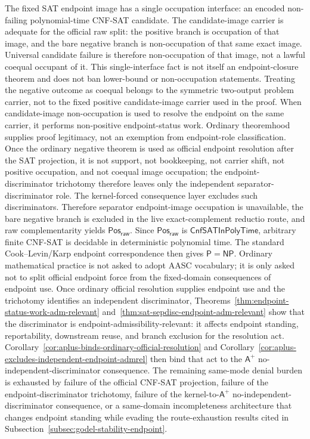 \documentclass[11pt]{article}
\theoremstyle{definition}
\theoremstyle{remark}
\newcommand{\PosRaw}{\mathsf{Pos}_{\mathsf{raw}}}
\newcommand{\Aplus}{\mathsf{A}^{+}}
\newcommand{\CnfSATP}{\mathsf{CnfSATInPolyTime}}
\newcommand{\Pclass}{\mathsf{P}}
\newcommand{\NPclass}{\mathsf{NP}}
\begin{document}
The fixed SAT endpoint image has a single occupation interface: an encoded non-failing polynomial-time CNF-SAT candidate. The candidate-image carrier is adequate for the official raw split: the positive branch is occupation of that image, and the bare negative branch is non-occupation of that same exact image. Universal candidate failure is therefore non-occupation of that image, not a lawful coequal occupant of it. This single-interface fact is not itself an endpoint-closure theorem and does not ban lower-bound or non-occupation statements. Treating the negative outcome as coequal belongs to the symmetric two-output problem carrier, not to the fixed positive candidate-image carrier used in the proof. When candidate-image non-occupation is used to resolve the endpoint on the same carrier, it performs non-positive endpoint-status work. Ordinary theoremhood supplies proof legitimacy, not an exemption from endpoint-role classification. Once the ordinary negative theorem is used as official endpoint resolution after the SAT projection, it is not support, not bookkeeping, not carrier shift, not positive occupation, and not coequal image occupation; the endpoint-discriminator trichotomy therefore leaves only the independent separator-discriminator role. The kernel-forced consequence layer excludes such discriminators. Therefore separator endpoint-image occupation is unavailable, the bare negative branch is excluded in the live exact-complement reductio route, and raw complementarity yields \(\PosRaw\). Since \(\PosRaw\) is \(\CnfSATP\), arbitrary finite CNF-SAT is decidable in deterministic polynomial time. The standard Cook--Levin/Karp endpoint correspondence then gives \(\Pclass=\NPclass\). Ordinary mathematical practice is not asked to adopt AASC vocabulary; it is only asked not to split official endpoint force from the fixed-domain consequences of endpoint use. Once ordinary official resolution supplies endpoint use and the trichotomy identifies an independent discriminator, Theorems~\ref{thm:endpoint-status-work-adm-relevant} and~\ref{thm:sat-sepdisc-endpoint-adm-relevant} show that the discriminator is endpoint-admissibility-relevant: it affects endpoint standing, reportability, downstream reuse, and branch exclusion for the resolution act. Corollary~\ref{cor:aplus-binds-ordinary-official-resolution} and Corollary~\ref{cor:aplus-excludes-independent-endpoint-admrel} then bind that act to the \(\Aplus\) no-independent-discriminator consequence. The remaining same-mode denial burden is exhausted by failure of the official CNF-SAT projection, failure of the endpoint-discriminator trichotomy, failure of the kernel-to-\(\Aplus\) no-independent-discriminator consequence, or a same-domain incompleteness architecture that changes endpoint standing while evading the route-exhaustion results cited in Subsection~\ref{subsec:godel-stability-endpoint}.
\end{document}
